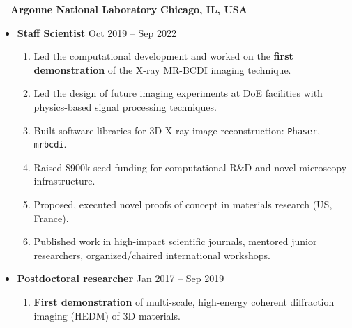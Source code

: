~~{\color{black}\textbf{Argonne National Laboratory} \hfill  \textbf{Chicago, IL, USA}}\par
\begin{itemize}
    \item
        \textbf{Staff Scientist}
        \hfill  {Oct 2019 -- Sep 2022} \par
        \begin{enumerate}
            \item Led the computational development and worked on the \textbf{first demonstration} of the X-ray MR-BCDI imaging technique.
            \item Led the design of future imaging experiments at DoE facilities with physics-based signal processing techniques.
            \item Built software libraries for 3D X-ray image reconstruction: \texttt{Phaser}, \texttt{mrbcdi}. 
            \item Raised \$900k seed funding for computational R\&D and novel microscopy infrastructure. 
            \item Proposed, executed novel proofs of concept in materials research (US, France).
            \item Published work in high-impact scientific journals, mentored junior researchers, organized/chaired international workshops.
        \end{enumerate}
    \item
        \textbf{Postdoctoral researcher}
        \hfill  {Jan 2017 -- Sep 2019} \par
        \begin{enumerate}
            \item \textbf{First demonstration} of multi-scale, high-energy coherent diffraction imaging (HEDM) of 3D materials.
        \end{enumerate}
\end{itemize}